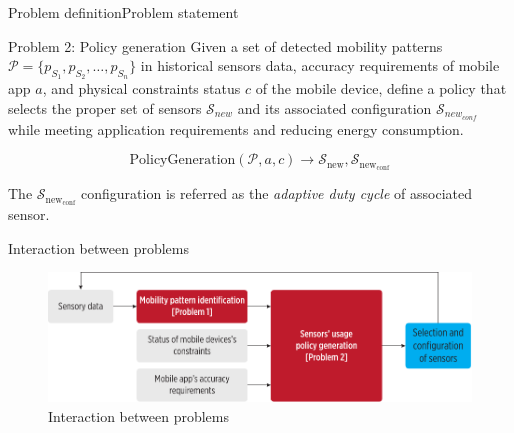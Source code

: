 \documentclass[8pt,xcolor={dvipsnames},handout]{beamer}
\begin{document}
\begin{frame}{Problem definition}{Problem statement}
\begin{alertblock}{Problem 2: Policy generation}
Given a set of detected mobility patterns $\mathcal{P} = \{ p_{S_1}, p_{S_2}, \ldots, p_{S_n} \}$ in historical sensors data, accuracy requirements of mobile app $a$, and physical constraints status $c$ of the mobile device, define a policy that selects the proper set of sensors $\mathcal{S}_{new}$ and its associated configuration $\mathcal{S}_{new_{conf}}$  while meeting application requirements and reducing energy consumption.

$$
  \text{PolicyGeneration}( \mathcal{P}, a, c ) \longrightarrow{} \mathcal{S}_{\text{new}}, \mathcal{S}_{\text{new}_{\text{conf}}}
$$

The $\mathcal{S}_{\text{new}_{\text{conf}}}$ configuration is referred as the \emph{adaptive duty cycle} of associated sensor.
\end{alertblock}
\end{frame}

\begin{frame}{Interaction between problems}
\begin{figure}[tb]
  \centering
  \includegraphics[width=\textwidth]{../../../resources/images/vectors/problems-incorporation}
  \caption{Interaction between problems}
  \label{fig:problems-incorporation}
\end{figure}
\end{frame}
\end{document}
